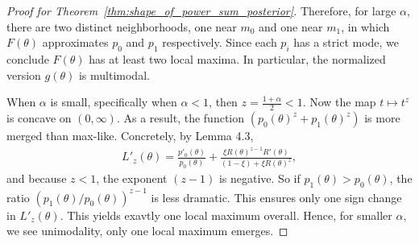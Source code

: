 \documentclass[12pt]{article}
\begin{document}
\begin{proof}[Proof for Theorem~\ref{thm:shape_of_power_sum_posterior}]
    Therefore, for large $\alpha$, there are two distinct neighborhoods, one near $m_0$ and one near $m_1$, in which $F(\theta)$ approximates $p_0$ and $p_1$ respectively.
    Since each $p_i$ has a strict mode, we conclude $F(\theta)$ has at least two local maxima.
    In particular, the normalized version $g(\theta)$ is multimodal.

    When $\alpha$ is small, specifically when $\alpha < 1$, then $z = \frac{1 + \alpha}{2} < 1$.
    Now the map $t \mapsto t^z$ is concave on $(0, \infty)$.
    As a result, the function $(p_0(\theta)^z + p_1(\theta)^z)$ is more merged than max-like.
    Concretely, by Lemma 4.3,
    \begin{align*}
        L'_z(\theta) = \frac{p'_0(\theta)}{p_0(\theta)} + \frac{\xi R(\theta)^{z-1}R'(\theta)}{(1 - \xi) + \xi R(\theta)^z},
    \end{align*}
    and because $z < 1$, the exponent $(z - 1)$ is negative.
    So if $p_1(\theta) > p_0(\theta)$, the ratio $(p_1(\theta) / p_0(\theta))^{z-1}$ is less dramatic. 
    This ensures only one sign change in $L'_z(\theta)$.
    This yields exavtly one local maximum overall.
    Hence, for smaller $\alpha$, we see unimodality, only one local maximum emerges.
\end{proof}
\end{document}
